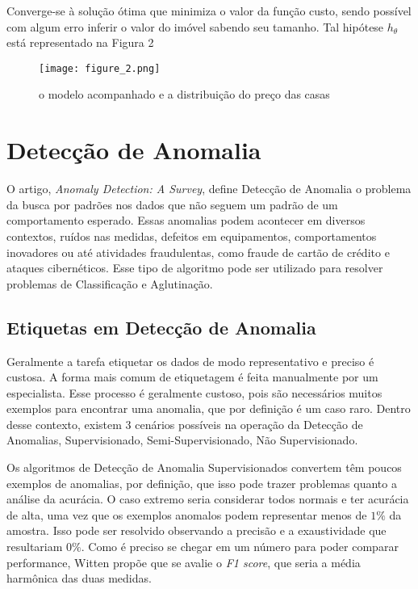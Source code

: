Converge-se à solução ótima que minimiza o valor da função custo, sendo possível com algum erro inferir o valor do imóvel sabendo seu tamanho. Tal hipótese \(h_{\theta}\) está representado na Figura 2

\begin{figure}
	\centering
		\texttt{[image: figure\_2.png]}
		\caption{o modelo acompanhado e a distribuição do preço das casas}
		\label{casas}
\end{figure}



\section{Detecção de Anomalia}

O artigo, \textit{Anomaly Detection: A Survey}\cite{chandola2009anomaly}, define Detecção de Anomalia o problema da busca por padrões nos dados que não seguem um padrão de um comportamento esperado. Essas anomalias podem acontecer em diversos contextos, ruídos nas medidas, defeitos em equipamentos, comportamentos inovadores ou até atividades fraudulentas, como fraude de cartão de crédito e ataques cibernéticos. Esse tipo de algoritmo pode ser utilizado para resolver problemas de Classificação e Aglutinação.

\subsection{Etiquetas em Detecção de Anomalia}

Geralmente a tarefa etiquetar os dados de modo representativo e preciso é custosa. A forma mais comum de etiquetagem é feita manualmente por um especialista. Esse processo é geralmente custoso, pois são necessários muitos exemplos para encontrar uma anomalia, que por definição é um caso raro. Dentro desse contexto, existem 3 cenários possíveis na operação da Detecção de Anomalias, Supervisionado, Semi-Supervisionado, Não Supervisionado.

Os algoritmos de Detecção de Anomalia Supervisionados convertem têm poucos exemplos de anomalias, por definição, que isso pode trazer problemas quanto a análise da acurácia. O caso extremo seria considerar todos normais e ter acurácia de alta, uma vez que os exemplos anomalos podem representar menos de \(1\%\) da amostra. Isso pode ser resolvido observando a precisão e a exaustividade que resultariam \(0\%\). Como é preciso se chegar em um número para poder comparar performance, Witten\cite{witten2011data} propõe que se avalie o \textit{F1 score}, que seria a média harmônica das duas medidas.

